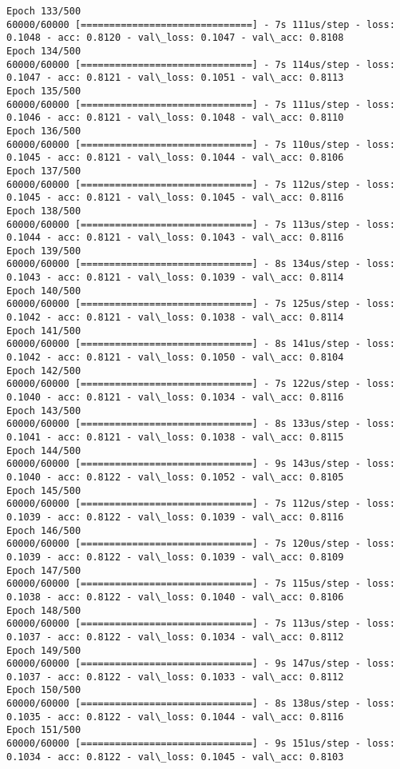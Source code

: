 \documentclass[11pt]{article}
\begin{document}
\begin{Verbatim}[commandchars=\\\{\}]
Epoch 133/500
60000/60000 [==============================] - 7s 111us/step - loss: 0.1048 - acc: 0.8120 - val\_loss: 0.1047 - val\_acc: 0.8108
Epoch 134/500
60000/60000 [==============================] - 7s 114us/step - loss: 0.1047 - acc: 0.8121 - val\_loss: 0.1051 - val\_acc: 0.8113
Epoch 135/500
60000/60000 [==============================] - 7s 111us/step - loss: 0.1046 - acc: 0.8121 - val\_loss: 0.1048 - val\_acc: 0.8110
Epoch 136/500
60000/60000 [==============================] - 7s 110us/step - loss: 0.1045 - acc: 0.8121 - val\_loss: 0.1044 - val\_acc: 0.8106
Epoch 137/500
60000/60000 [==============================] - 7s 112us/step - loss: 0.1045 - acc: 0.8121 - val\_loss: 0.1045 - val\_acc: 0.8116
Epoch 138/500
60000/60000 [==============================] - 7s 113us/step - loss: 0.1044 - acc: 0.8121 - val\_loss: 0.1043 - val\_acc: 0.8116
Epoch 139/500
60000/60000 [==============================] - 8s 134us/step - loss: 0.1043 - acc: 0.8121 - val\_loss: 0.1039 - val\_acc: 0.8114
Epoch 140/500
60000/60000 [==============================] - 7s 125us/step - loss: 0.1042 - acc: 0.8121 - val\_loss: 0.1038 - val\_acc: 0.8114
Epoch 141/500
60000/60000 [==============================] - 8s 141us/step - loss: 0.1042 - acc: 0.8121 - val\_loss: 0.1050 - val\_acc: 0.8104
Epoch 142/500
60000/60000 [==============================] - 7s 122us/step - loss: 0.1040 - acc: 0.8121 - val\_loss: 0.1034 - val\_acc: 0.8116
Epoch 143/500
60000/60000 [==============================] - 8s 133us/step - loss: 0.1041 - acc: 0.8121 - val\_loss: 0.1038 - val\_acc: 0.8115
Epoch 144/500
60000/60000 [==============================] - 9s 143us/step - loss: 0.1040 - acc: 0.8122 - val\_loss: 0.1052 - val\_acc: 0.8105
Epoch 145/500
60000/60000 [==============================] - 7s 112us/step - loss: 0.1039 - acc: 0.8122 - val\_loss: 0.1039 - val\_acc: 0.8116
Epoch 146/500
60000/60000 [==============================] - 7s 120us/step - loss: 0.1039 - acc: 0.8122 - val\_loss: 0.1039 - val\_acc: 0.8109
Epoch 147/500
60000/60000 [==============================] - 7s 115us/step - loss: 0.1038 - acc: 0.8122 - val\_loss: 0.1040 - val\_acc: 0.8106
Epoch 148/500
60000/60000 [==============================] - 7s 113us/step - loss: 0.1037 - acc: 0.8122 - val\_loss: 0.1034 - val\_acc: 0.8112
Epoch 149/500
60000/60000 [==============================] - 9s 147us/step - loss: 0.1037 - acc: 0.8122 - val\_loss: 0.1033 - val\_acc: 0.8112
Epoch 150/500
60000/60000 [==============================] - 8s 138us/step - loss: 0.1035 - acc: 0.8122 - val\_loss: 0.1044 - val\_acc: 0.8116
Epoch 151/500
60000/60000 [==============================] - 9s 151us/step - loss: 0.1034 - acc: 0.8122 - val\_loss: 0.1045 - val\_acc: 0.8103

\end{Verbatim}
\end{document}
